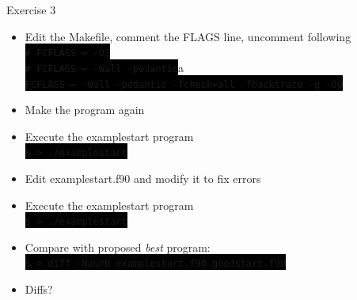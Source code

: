 \documentclass[unknownkeysallowed, 10pt, a4 paper, handout]{beamer}
\newcommand{\code}[1]{\colorbox{black}{\color{green}\texttt{#1}}}
\begin{document}
\begin{frame}[label=exercise3]{Exercise 3}
  \begin{itemize}
    \item Edit the Makefile, comment the FLAGS line, uncomment following \\
       \code{\# FCFLAGS = -O2} \\
       \code{\# FCFLAGS = -Wall -pedantic}a \\
       \code{FCFLAGS = -Wall -pedantic -fcheck=all -fbacktrace -g -O0}
    \item Make the program again
    \item Execute the examplestart program \\
       \code{\$ > ./examplestart}
    \item Edit examplestart.f90 and modify it to fix errors
    \item Execute the examplestart program \\
       \code{\$ > ./examplestart}
    \item Compare with proposed \textit{best} program: \\
       \code{\$ > diff -Naurb examplestart.f90 goodstart.f90}
    \item Diffs?
  \end{itemize}
\end{frame}
\end{document}
